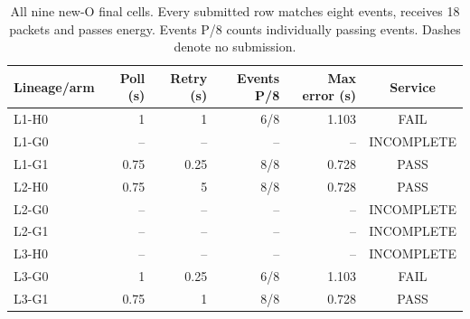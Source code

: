 \begin{table}[htbp]
\centering\small
\caption{All nine new-O final cells. Every submitted row matches eight events, receives 18 packets and passes energy. Events P/8 counts individually passing events. Dashes denote no submission.}
\label{tab:ofinal}
\begin{tabular}{@{}lrrrrc@{}}\toprule
Lineage/arm & Poll (s) & Retry (s) & Events P/8 & Max error (s) & Service \\\midrule
L1-H0 & 1 & 1 & 6/8 & 1.103 & FAIL \\
L1-G0 & -- & -- & -- & -- & INCOMPLETE \\
L1-G1 & 0.75 & 0.25 & 8/8 & 0.728 & PASS \\
L2-H0 & 0.75 & 5 & 8/8 & 0.728 & PASS \\
L2-G0 & -- & -- & -- & -- & INCOMPLETE \\
L2-G1 & -- & -- & -- & -- & INCOMPLETE \\
L3-H0 & -- & -- & -- & -- & INCOMPLETE \\
L3-G0 & 1 & 0.25 & 6/8 & 1.103 & FAIL \\
L3-G1 & 0.75 & 1 & 8/8 & 0.728 & PASS \\
\bottomrule\end{tabular}
\end{table}
